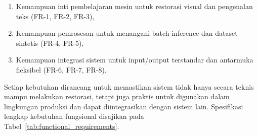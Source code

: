 \documentclass[12pt,a4paper]{article}
\begin{document}
\begin{enumerate}[nosep]
    \item Kemampuan inti pembelajaran mesin untuk restorasi visual dan pengenalan teks (FR-1, FR-2, FR-3),
    \item Kemampuan pemrosesan untuk menangani batch inference dan dataset sintetis (FR-4, FR-5),
    \item Kemampuan integrasi sistem untuk input/output terstandar dan antarmuka fleksibel (FR-6, FR-7, FR-8).
\end{enumerate}

Setiap kebutuhan dirancang untuk memastikan sistem tidak hanya secara teknis mampu melakukan restorasi, tetapi juga praktis untuk digunakan dalam lingkungan produksi dan dapat diintegrasikan dengan sistem lain. Spesifikasi lengkap kebutuhan fungsional disajikan pada Tabel~\ref{tab:functional_requirements}.
\end{document}
